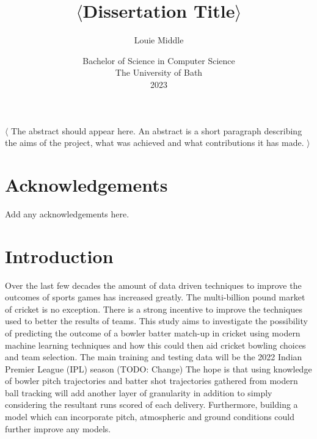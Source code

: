 \documentclass[12pt,a4paper]{report}
\title{\bf $\langle$Dissertation Title$\rangle$}
\author{Louie Middle}
\date{Bachelor of Science in Computer Science\\ 
      The University of Bath\\
      2023}
\begin{document}
\hypersetup{pageanchor=false}	

\lstset{language=Java,breaklines,breakatwhitespace,basicstyle=\small}

\setcounter{page}{0}

\maketitle
\newpage

\newpage

\newpage

\hypersetup{pageanchor=true}

\abstract
$\langle$
The abstract should appear here. 
An abstract is a short paragraph describing the aims of the project, what was achieved and what contributions it has made.
$\rangle$
\newpage

\tableofcontents
\newpage

\listoffigures
\newpage

\listoftables
\newpage

\chapter*{Acknowledgements}

Add any acknowledgements here.

\newpage
\setcounter{page}{1}

\chapter{Introduction}

Over the last few decades the amount of data driven techniques to improve the outcomes of sports games has increased greatly. 
The multi-billion pound market of cricket is no exception. 
There is a strong incentive to improve the techniques used to better the results of teams. 
This study aims to investigate the possibility of predicting the outcome of a bowler batter match-up in cricket using modern machine learning techniques and how this could then aid cricket bowling choices and team selection. 
The main training and testing data will be the 2022 Indian Premier League (IPL) season (TODO: Change)
The hope is that using knowledge of bowler pitch trajectories and batter shot trajectories gathered from modern ball tracking will add another layer of granularity in addition to simply considering the resultant runs scored of each delivery. 
Furthermore, building a model which can incorporate pitch, atmospheric and ground conditions could further improve any models. 
\end{document}
